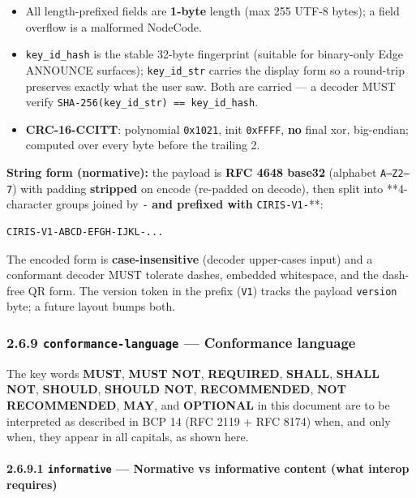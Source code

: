 \documentclass[11pt]{article}
\begin{document}
\begin{itemize}\setlength\itemsep{0pt}
\item All length-prefixed fields are \textbf{1-byte} length (max 255 UTF-8 bytes); a field overflow is a malformed NodeCode.
\item \texttt{key\_id\_hash} is the stable 32-byte fingerprint (suitable for binary-only Edge ANNOUNCE surfaces); \texttt{key\_id\_str} carries the display form so a round-trip preserves exactly what the user saw. Both are carried — a decoder MUST verify \texttt{SHA-256(key\_id\_str) == key\_id\_hash}.
\item \textbf{CRC-16-CCITT}: polynomial \texttt{0x1021}, init \texttt{0xFFFF}, \textbf{no} final xor, big-endian; computed over every byte before the trailing 2.
\end{itemize}


\textbf{String form (normative):} the payload is \textbf{RFC 4648 base32} (alphabet \texttt{A–Z2–7}) with padding \textbf{stripped} on encode (re-padded on decode), then split into **4-character groups joined by \texttt{-}\textbf{ and prefixed with }\texttt{CIRIS-V1-}**:


\begin{lstlisting}
CIRIS-V1-ABCD-EFGH-IJKL-...
\end{lstlisting}

The encoded form is \textbf{case-insensitive} (decoder upper-cases input) and a conformant decoder MUST tolerate dashes, embedded whitespace, and the dash-free QR form. The version token in the prefix (\texttt{V1}) tracks the payload \texttt{version} byte; a future layout bumps both.


\subsubsection*{2.6.9 \texttt{conformance-language} — Conformance language}


The key words \textbf{MUST}, \textbf{MUST NOT}, \textbf{REQUIRED}, \textbf{SHALL}, \textbf{SHALL NOT}, \textbf{SHOULD}, \textbf{SHOULD NOT}, \textbf{RECOMMENDED}, \textbf{NOT RECOMMENDED}, \textbf{MAY}, and \textbf{OPTIONAL} in this document are to be interpreted as described in BCP 14 (RFC 2119 + RFC 8174) when, and only when, they appear in all capitals, as shown here.


\paragraph{2.6.9.1 \texttt{informative} — Normative vs informative content (what interop requires)}\mbox{}\\
\end{document}
